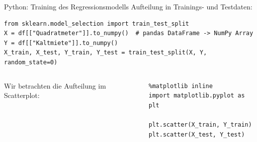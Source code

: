\begin{frame}[fragile]{Python: Training des Regressionsmodells}
\medskip
Aufteilung in Trainings- und Testdaten:
\begin{verbatim}
from sklearn.model_selection import train_test_split
X = df[["Quadratmeter"]].to_numpy()  # pandas DataFrame -> NumPy Array
Y = df[["Kaltmiete"]].to_numpy()
X_train, X_test, Y_train, Y_test = train_test_split(X, Y, random_state=0)
\end{verbatim}

\begin{columns}

Wir betrachten die Aufteilung im Scatterplot:

\begin{verbatim}
%matplotlib inline
import matplotlib.pyplot as plt

plt.scatter(X_train, Y_train)
plt.scatter(X_test, Y_test)
\end{verbatim}


\end{columns}
\end{frame}

